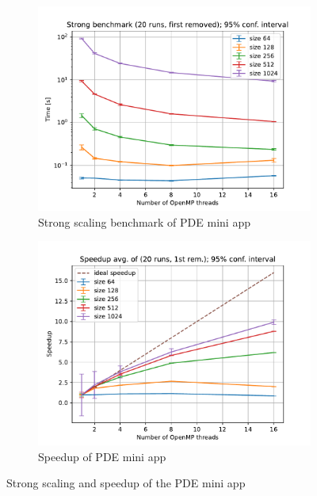 \documentclass[unicode,11pt,a4paper,oneside,numbers=endperiod,openany]{scrartcl}
\begin{document}
\begin{figure}[h!t]
    \begin{subfigure}{.5\textwidth}
        \includegraphics[width=\textwidth]{plots/strong_scaling.pdf}
        \caption{Strong scaling benchmark of PDE mini app}
        \label{fig:strong_scaling}
    \end{subfigure}
    \begin{subfigure}{.5\textwidth}
        \includegraphics[width=\textwidth]{plots/strong_speedup.pdf}
        \caption{Speedup of PDE mini app}
        \label{fig:strong_speedup}
    \end{subfigure}
    \caption{Strong scaling and speedup of the PDE mini app}
\end{figure}
\end{document}
